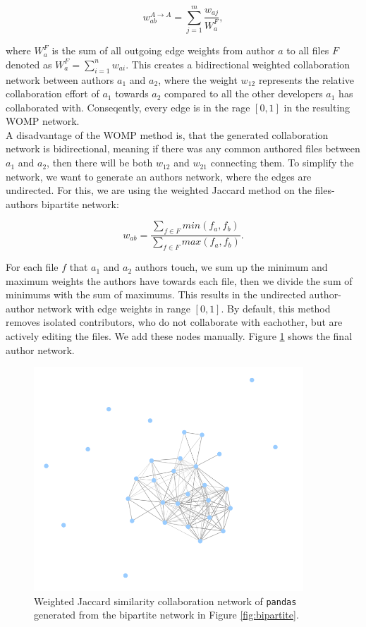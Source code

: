\[ w_{ab}^{A \rightarrow A} = \sum_{j=1}^m \frac{w_{aj}}{W_a^F}, \]

where $W_a^F$ is the sum of all outgoing edge weights from author $a$ to all files $F$ denoted as $W_a^F = \sum_{i=1}^n w_{ai}$. This creates a bidirectional weighted collaboration network between authors $a_1$ and $a_2$, where the weight $w_{12}$ represents the relative collaboration effort of $a_1$ towards $a_2$ compared to all the other developers $a_1$ has collaborated with. Conseqently, every edge is in the rage $[0,1]$ in the resulting WOMP network. \\

A disadvantage of the WOMP method is, that the generated collaboration network is bidirectional, meaning if there was any common authored files between $a_1$ and $a_2$, then there will be both $w_{12}$ and $w_{21}$ connecting them. To simplify the network, we want to generate an authors network, where the edges are undirected. For this, we are using the weighted Jaccard method on the files-authors bipartite network:

\[ w_{ab} = \frac{\sum_{f \in F}min(f_a, f_b)}{\sum_{f \in F}max(f_a, f_b)}. \]

For each file $f$ that $a_1$ and $a_2$ authors touch, we sum up the minimum and maximum weights the authors have towards each file, then we divide the sum of minimums with the sum of maximums. This results in the undirected author-author network with edge weights in range $[0, 1]$. By default, this method removes isolated contributors, who do not collaborate with eachother, but are actively editing the files. We add these nodes manually. Figure \ref{fig:jaccard} shows the final author network. \\

\begin{figure}
    \centering
    \includegraphics[width=0.9\textwidth]{figures/jaccard.png}
    \caption{Weighted Jaccard similarity collaboration network of \texttt{pandas} generated from the bipartite network in Figure \ref{fig:bipartite}.}
    \label{fig:jaccard}
\end{figure}


